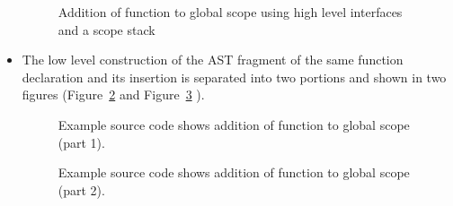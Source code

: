 \begin{itemize}
\begin{figure}[!h]
{{%
}
}
\caption{Addition of function to global scope using high level interfaces
  and a scope stack}
\label{Tutorial:exampleAddFunctionDeclaration3}
\end{figure}


\item  The low level construction of the AST fragment of the same function 
declaration and its insertion 
is separated into two portions and shown in two figures 
(Figure~\ref{Tutorial:exampleAddFunctionDeclarationA} and
Figure~\ref{Tutorial:exampleAddFunctionDeclarationB} ).
\begin{figure}[!h]
{\indent
{\mySmallestFontSize
\begin{latexonly}
%  
   
\end{latexonly}

\begin{htmlonly}
   
\end{htmlonly}

}
}
\caption{Example source code shows addition of function to global scope (part 1).}
\label{Tutorial:exampleAddFunctionDeclarationA}
\end{figure}

\begin{figure}[!h]
{\indent
{\mySmallestFontSize
\begin{latexonly}
%  
   
\end{latexonly}

\begin{htmlonly}
   
\end{htmlonly}

}
}
\caption{Example source code shows addition of function to global scope (part 2).}
\label{Tutorial:exampleAddFunctionDeclarationB}
\end{figure}


\end{itemize}

